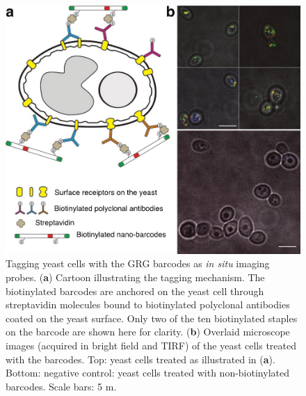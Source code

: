 \begin{figure} %
\includegraphics[width=\textwidth]{figures/dna6}
\caption[Tagging yeast cells with the GRG barcodes as \textit{in situ} imaging probes.]{Tagging yeast cells with the GRG barcodes as \textit{in situ} imaging probes. (\textbf{a}) 
Cartoon illustrating the tagging mechanism. The biotinylated barcodes are anchored on 
the yeast cell through streptavidin molecules bound to biotinylated polyclonal antibodies 
coated on the yeast surface. Only two of the ten biotinylated staples on the barcode are 
shown here for clarity. (\textbf{b}) Overlaid microscope images (acquired in bright field and 
TIRF) of the yeast cells treated with the barcodes. Top: yeast cells treated as illustrated in 
(\textbf{a}). Bottom: negative control: yeast cells treated with non-biotinylated barcodes. Scale 
bars: 5 \textmu m.
\label{fig:dna6}}
\end{figure}
\afterpage{\clearpage}



